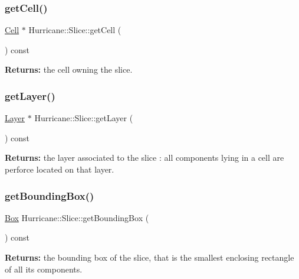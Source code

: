 \subsubsection{\texorpdfstring{get\+Cell()}{getCell()}}
{\footnotesize\ttfamily \mbox{\hyperlink{classHurricane_1_1Cell}{Cell}} $\ast$ Hurricane\+::\+Slice\+::get\+Cell (\begin{DoxyParamCaption}{ }\end{DoxyParamCaption}) const\hspace{0.3cm}{\ttfamily [inline]}}

{\bfseries Returns\+:} the cell owning the slice. \mbox{\label{classHurricane_1_1Slice_a76c011cd461e588474a22fd0026e1f8f}} 
\subsubsection{\texorpdfstring{get\+Layer()}{getLayer()}}
{\footnotesize\ttfamily \mbox{\hyperlink{classHurricane_1_1Layer}{Layer}} $\ast$ Hurricane\+::\+Slice\+::get\+Layer (\begin{DoxyParamCaption}{ }\end{DoxyParamCaption}) const\hspace{0.3cm}{\ttfamily [inline]}}

{\bfseries Returns\+:} the layer associated to the slice \+: all components lying in a cell are perforce located on that layer. \mbox{\label{classHurricane_1_1Slice_aa1a139b188879c37a8878a2353401d65}} 
\subsubsection{\texorpdfstring{get\+Bounding\+Box()}{getBoundingBox()}}
{\footnotesize\ttfamily \mbox{\hyperlink{classHurricane_1_1Box}{Box}} Hurricane\+::\+Slice\+::get\+Bounding\+Box (\begin{DoxyParamCaption}{ }\end{DoxyParamCaption}) const\hspace{0.3cm}{\ttfamily [inline]}}

{\bfseries Returns\+:} the bounding box of the slice, that is the smallest enclosing rectangle of all its components. 

